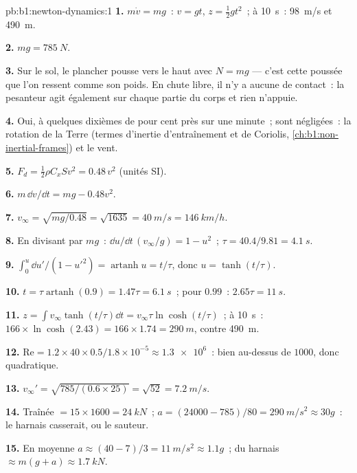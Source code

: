 \begin{solution}{pb:b1:newton-dynamics:1}
\textbf{1.} $m\dot v = mg$~: $v = gt$, $z = \tfrac12 gt^2$~; à \qty{10}{s}~:
\qty{98}{m/s} et \qty{490}{m}.

\textbf{2.} $mg = \qty{785}{N}$.

\textbf{3.} Sur le sol, le plancher pousse vers le haut avec $N = mg$ ---
c'est cette poussée que l'on ressent comme son poids. En chute libre, il
n'y a aucune  de contact~: la pesanteur agit également sur chaque
partie du corps et rien n'appuie.

\textbf{4.} Oui, à quelques dixièmes de pour cent près sur une minute~;
sont négligées~: la rotation de la Terre (termes d'inertie d'entraînement
et de Coriolis, \cref{ch:b1:non-inertial-frames}) et le vent.

\textbf{5.} $F_d = \tfrac12\rho C_xSv^2 = 0.48\,v^2$ (unités SI).

\textbf{6.} $m\,\dd v/\dd t = mg - 0.48v^2$.

\textbf{7.} $v_\infty = \sqrt{mg/0.48} = \sqrt{1635} = \qty{40}{m/s} =
\qty{146}{km/h}$.

\textbf{8.} En divisant par $mg$~: $\dd u/\dd t\,(v_\infty/g) = 1 - u^2$~;
$\tau = 40.4/9.81 = \qty{4.1}{s}$.

\textbf{9.} $\int_0^u\dd u'/(1 - u'^2) = \operatorname{artanh}u = t/\tau$,
donc $u = \tanh(t/\tau)$.

\textbf{10.} $t = \tau\operatorname{artanh}(0.9) = 1.47\tau = \qty{6.1}{s}$~;
pour $0.99$~: $2.65\tau = \qty{11}{s}$.

\textbf{11.} $z = \int v_\infty\tanh(t/\tau)\dd t = v_\infty\tau\ln\cosh(t/\tau)$~;
à \qty{10}{s}~: $166 \times \ln\cosh(2.43) = 166 \times 1.74 = \qty{290}{m}$,
contre \qty{490}{m}.

\textbf{12.} $\mathrm{Re} = 1.2 \times 40 \times 0.5/1.8\times10^{-5} \approx
\num{1.3e6}$~: bien au-dessus de $1000$, donc quadratique.

\textbf{13.} $v_\infty' = \sqrt{785/(0.6 \times 25)} = \sqrt{52} = \qty{7.2}{m/s}$.

\textbf{14.} Traînée $= 15 \times 1600 = \qty{24}{kN}$~; $a = (24000 - 785)/80
= \qty{290}{m/s^2} \approx 30g$~: le harnais casserait, ou le sauteur.

\textbf{15.} En moyenne $a \approx (40 - 7)/3 = \qty{11}{m/s^2} \approx 1.1g$~;
 du harnais $\approx m(g + a) \approx \qty{1.7}{kN}$.


\end{solution}

